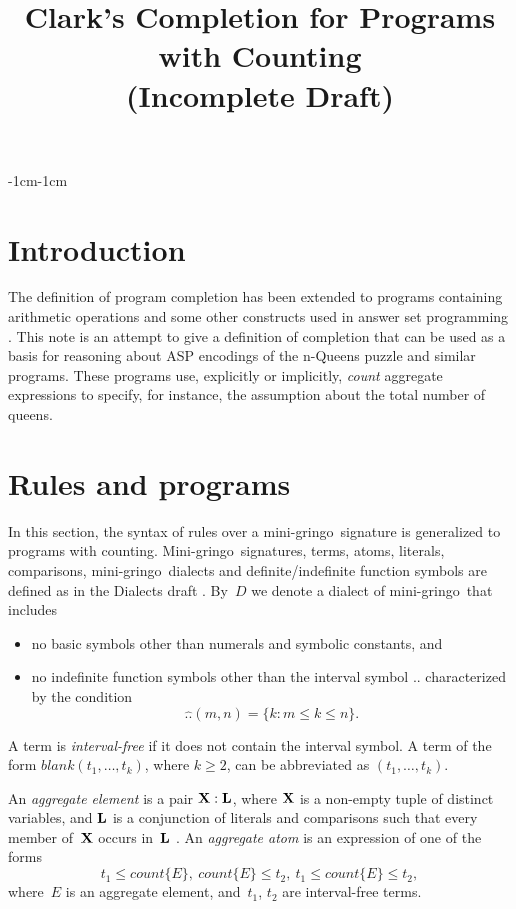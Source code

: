 \documentclass[11pt]{article}
\title{Clark's Completion for Programs with Counting\\
  (Incomplete Draft)}
\def\gringo{{\sc gringo}}
\def\mg{mini-\gringo}
\def\bfx{{\bf X}}
\newcommand{\co}{\ensuremath{\mathit{count}}}
\begin{document}
\maketitle

\begin{adjustwidth}{-1cm}{-1cm}

  \section{Introduction}
  
  The definition of program completion \cite{cla78} has been extended
  to programs containing arithmetic operations and some other constructs
  used in answer set programming \cite{har17a,lif23,fan24b,fan22}.
  This note is an attempt to give a definition of completion
  that can be used   as a basis for reasoning about ASP encodings
  of the n-Queens puzzle \cite[Section~3.1]{geb11b} and similar programs.
  These programs use, explicitly or implicitly, \emph{count} aggregate
  expressions to specify, for instance, the assumption about the total
  number of queens.
  
  \section{Rules and programs}\label{sec:rules}
  
  In this section,
  the syntax of rules over a \mg\ signature %
  is   generalized to programs with counting.
    Mini-\gringo\ signatures, terms, atoms,
  literals, comparisons, \mg\ dialects and definite/indefinite function
  symbols are defined
  as in the Dialects draft \cite[Sections~2 and~3]{fan26b}.  By~$D$ we
  denote a dialect of \mg\ that includes
  \begin{itemize}
  \item no basic symbols other than numerals and symbolic constants, and
    \item no indefinite function symbols
  other than the interval symbol $..$ characterized by the condition
  $$\widehat{..}(m,n)=\{k: m\leq k\leq n\}.$$
\end{itemize}
A term is \emph{interval-free} if it does not
contain the interval symbol.
A term of the form $\mathit{blank}(t_1,\dots,t_k)$, where $k\geq 2$,
can be abbreviated as $(t_1,\dots,t_k)$.

An \emph{aggregate element} is a pair
$\bfx:{\bf L}$,
where $\bfx$ is a non-empty tuple of distinct variables,
and $\bf L$ is a conjunction of
literals and comparisons such that every member of~$\bfx$ occurs in~$\bf L$
\cite[Section~4]{lif22a}.  An \emph{aggregate atom} is an expression of
one of the forms
$$t_1\leq \co \{E\},\ \co \{E\}\leq t_2,\ t_1\leq \co \{E\}\leq t_2,$$
where~$E$ is an aggregate element, and~$t_1$, $t_2$ are interval-free terms.


\end{adjustwidth}
\end{document}
